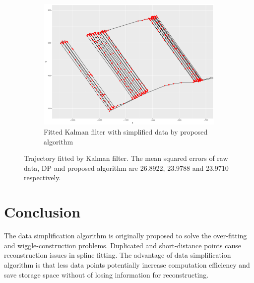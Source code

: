 \begin{figure}[h]
\begin{subfigure}[t]{0.47\textwidth}
\includegraphics[width=\linewidth]{Chapters/06Spinoff/plot/ggSPKF2.pdf}
\caption{Fitted Kalman filter with simplified data by proposed algorithm}
\end{subfigure}
\caption{Trajectory fitted by Kalman filter. The mean squared errors of raw data, DP and proposed algorithm are 26.8922, 23.9788 and 23.9710 respectively.}\label{DataSimpKFTra}
\end{figure}


\section{Conclusion}

The data simplification algorithm is originally proposed to solve the over-fitting and wiggle-construction problems. Duplicated and short-distance points cause reconstruction issues in spline fitting. The advantage of data simplification algorithm is that less data points potentially increase computation efficiency and save storage space without of losing information for reconstructing.  
